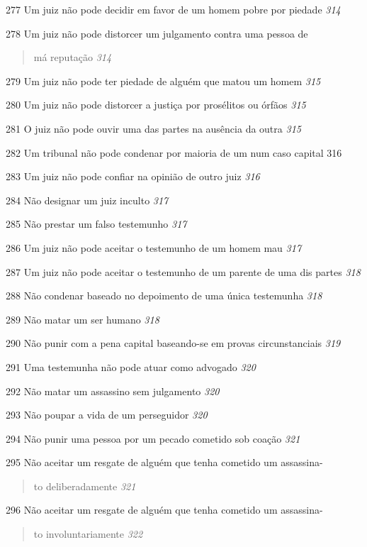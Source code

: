 277 Um juiz não pode decidir em favor de um homem pobre por piedade
\emph{314}

278 Um juiz não pode distorcer um julgamento contra uma pessoa de

\begin{quote}
má reputação \emph{314}
\end{quote}

279 Um juiz não pode ter piedade de alguém que matou um homem \emph{315}

280 Um juiz não pode distorcer a justiça por prosélitos ou órfãos
\emph{315}

281 O juiz não pode ouvir uma das partes na ausência da outra \emph{315}

282 Um tribunal não pode condenar por maioria de um num caso capital 316

283 Um juiz não pode confiar na opinião de outro juiz \emph{316}

284 Não designar um juiz inculto \emph{317}

285 Não prestar um falso testemunho \emph{317}

286 Um juiz não pode aceitar o testemunho de um homem mau \emph{317}

287 Um juiz não pode aceitar o testemunho de um parente de uma dis
partes \emph{318}

288 Não condenar baseado no depoimento de uma única testemunha
\emph{318}

289 Não matar um ser humano \emph{318}

290 Não punir com a pena capital baseando-se em provas circunstanciais
\emph{319}

291 Uma testemunha não pode atuar como advogado \emph{320}

292 Não matar um assassino sem julgamento \emph{320}

293 Não poupar a vida de um perseguidor \emph{320}

294 Não punir uma pessoa por um pecado cometido sob coação \emph{321}

295 Não aceitar um resgate de alguém que tenha cometido um assassina-

\begin{quote}
to deliberadamente \emph{321}
\end{quote}

296 Não aceitar um resgate de alguém que tenha cometido um assassina-

\begin{quote}
to involuntariamente \emph{322}
\end{quote}

